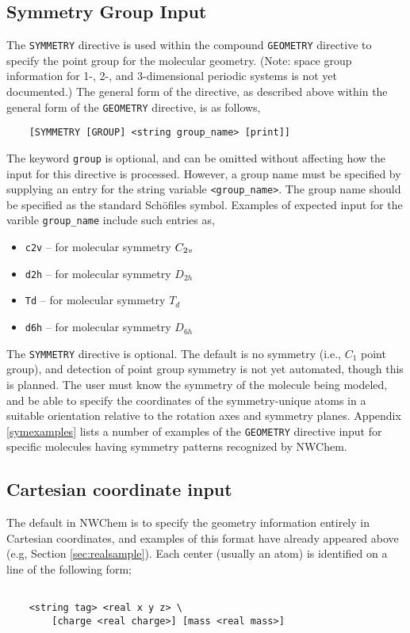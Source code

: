 \subsection{Symmetry Group Input}

The \verb+SYMMETRY+ directive is used within the compound \verb+GEOMETRY+
directive to specify the point group for the
molecular geometry. (Note: space group information for 1-, 2-, and
3-dimensional periodic systems is not yet documented.)
The general form of the directive, as described above within the general
form of the \verb+GEOMETRY+ directive, is as follows,
\begin{verbatim}
    [SYMMETRY [GROUP] <string group_name> [print]]
\end{verbatim}
The keyword \verb+group+ is optional, and can be omitted without affecting
how the input for this directive is processed.
However, a group name must be specified by supplying an entry for the
string variable \verb+<group_name>+.  The
group name should be specified as the standard Sch\"{o}files symbol.
Examples of expected input for the varible \verb+group_name+ include
such entries as,

\begin{itemize}
\item \verb+c2v+ -- for molecular symmetry $C_{2{\it v}}$
\item \verb+d2h+ -- for molecular symmetry $D_{2h}$
\item \verb+Td+ -- for molecular symmetry $T_d$
\item \verb+d6h+ -- for molecular symmetry $D_{6h}$
\end{itemize}

The \verb+SYMMETRY+ directive is optional.  The default is no symmetry 
(i.e., $C_1$ point group), and detection of point
group symmetry is not yet automated, though this is planned.  The user
must know the symmetry of the molecule being modeled, and be able
to specify the coordinates of the symmetry-unique atoms in a suitable
orientation relative to the rotation axes and symmetry planes.
Appendix \ref{symexamples} lists a number of examples of the
\verb+GEOMETRY+ directive input for specific molecules having symmetry
patterns recognized by NWChem.

\subsection{Cartesian coordinate input}
\label{sec:cart}

The default in NWChem is to specify the geometry information entirely
in Cartesian coordinates, and examples of this format have already
appeared above (e.g, Section \ref{sec:realsample}). Each center
(usually an atom) is identified on a line of the following form;
\begin{verbatim}

    <string tag> <real x y z> \
        [charge <real charge>] [mass <real mass>]

\end{verbatim}

